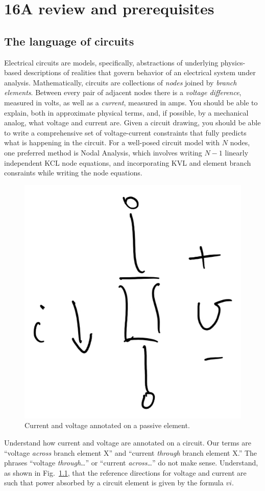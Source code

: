 \chapter{16A review and prerequisites}
\section{The language of circuits}
Electrical circuits are models, specifically, abstractions of underlying physics-based descriptions of realities that govern behavior of an electrical system under analysis. Mathematically, circuits are
collections of \emph{nodes} joined by \emph{branch elements}.
Between every pair of adjacent nodes there is a \emph{voltage difference},
 measured in volts,
as well as a \emph{current}, measured in amps.
You should be able to explain, both in approximate
physical terms, and, if possible,
by a mechanical analog, what voltage and current are.
Given a circuit drawing, you should be able to write a comprehensive set
of voltage-current constraints that fully predicts what is happening
in the circuit.
For a well-posed circuit model with \(N\) nodes, one preferred method is Nodal Analysis, which involves writing \(N - 1\) linearly independent KCL node equations, and incorporating KVL and element branch consraints while writing the node equations.

\begin{figure}[H]
  \begin{center}
    \includegraphics[width=0.25\linewidth]{figures/passive-sign}
  \end{center}
  \caption{Current and voltage annotated on a passive element.}
  \label{figure:circuit-review:passive-sign-convention}
\end{figure}
Understand how current and voltage are annotated on a circuit.
Our terms are ``voltage \emph{across} branch element X''
and ``current \emph{through} branch element X.''
The phrases ``voltage
\emph{through}\ldots'' or ``current \emph{across}\ldots'' do not
make sense.
Understand, as shown in
Fig.~\ref{figure:circuit-review:passive-sign-convention},
that the reference directions for voltage and current are such that
power absorbed by a circuit element is given by
the formula \(vi\).

